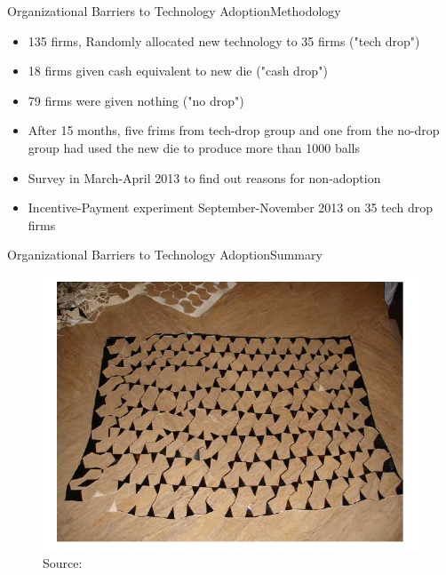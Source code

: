 \documentclass{beamer}
\begin{document}
\begin{frame}{Organizational Barriers to Technology Adoption}{Methodology}
\begin{itemize}
\item{135 firms, Randomly allocated new technology to 35 firms ("tech drop")}
\item{18 firms given cash equivalent to new die ("cash drop")}
\item{79 firms were given nothing ("no drop")}
\item{After 15 months, five frims from tech-drop group and one from the no-drop group had used the new die to produce more than 1000 balls}
\item{Survey in March-April 2013 to find out reasons for non-adoption}
\item{Incentive-Payment experiment September-November 2013 on 35 tech drop firms}
\end{itemize}
\end{frame}

\begin{frame}{Organizational Barriers to Technology Adoption}{Summary}
\begin{figure}[h]
\begin{centering}
  \includegraphics[width=\textwidth]{atkin1}
  \caption{Source: \cite{Atkin2015}}
   \label{fig:atkin1}
\end{centering}
\end{figure}
\end{frame}
\end{document}
